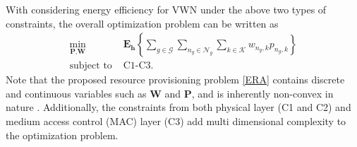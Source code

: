 \documentclass[journal,draftclsnofoot,12pt,onecolumn]{IEEEtran}
\begin{document}
{With considering energy efficiency for VWN under
the above two types of constraints,} the overall optimization
problem can be written as
\begin{align}\label{ERA}
\min\limits_{\textbf{P},\textbf{W}}~ &\textbf{E}_{\textbf{h}}\left\lbrace \sum\limits_{g \in \mathcal{G}}\sum\limits_{n_g \in \mathcal{N}_g}\sum\limits_{k \in \mathcal{K}}w_{n_g,k}p_{n_g,k}\right\rbrace \\
\text{subject to }&\text{C1-C3}.\nonumber
\end{align}
Note that {the proposed resource provisioning problem \eqref{ERA} contains discrete and continuous variables such as $\textbf{W}$ and $\textbf{P}$, and is inherently non-convex in nature \cite{6364677}. Additionally, the constraints from both physical layer (C1 and C2) and  medium access control (MAC) layer (C3) add multi dimensional complexity to the optimization problem.}
\end{document}
